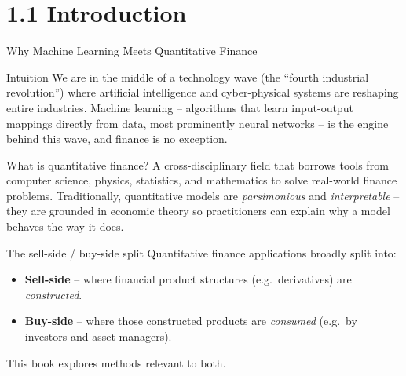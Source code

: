 \documentclass[aspectratio=169,10pt]{beamer}
\begin{document}
\section{1.1 Introduction}

\begin{frame}[allowframebreaks]{Why Machine Learning Meets Quantitative Finance}
  \begin{block}{Intuition}
    We are in the middle of a technology wave (the ``fourth industrial
    revolution'') where artificial intelligence and cyber-physical systems
    are reshaping entire industries. Machine learning -- algorithms that
    learn input-output mappings directly from data, most prominently neural
    networks -- is the engine behind this wave, and finance is no exception.
  \end{block}

  \begin{block}{What is quantitative finance?}
    A cross-disciplinary field that borrows tools from computer science,
    physics, statistics, and mathematics to solve real-world finance
    problems. Traditionally, quantitative models are \emph{parsimonious} and
    \emph{interpretable} -- they are grounded in economic theory so
    practitioners can explain why a model behaves the way it does.
  \end{block}

  \begin{block}{The sell-side / buy-side split}
    Quantitative finance applications broadly split into:
    \begin{itemize}
      \item \textbf{Sell-side} -- where financial product structures (e.g.\
      derivatives) are \emph{constructed}.
      \item \textbf{Buy-side} -- where those constructed products are
      \emph{consumed} (e.g.\ by investors and asset managers).
    \end{itemize}
    This book explores methods relevant to both.
  \end{block}
\end{frame}
\end{document}
